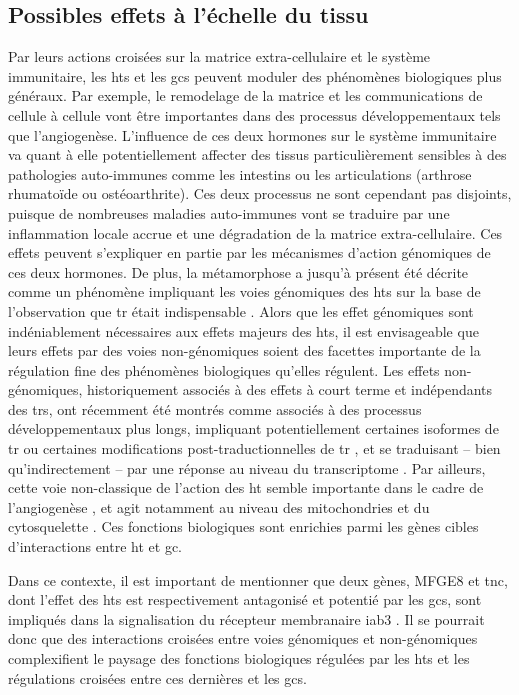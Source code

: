 \documentclass[../main.tex]{subfiles}
\begin{document}
	\subsection{Possibles effets à l’échelle du tissu}
		Par leurs actions croisées sur la matrice extra-cellulaire et le système immunitaire, les \glspl{ht} et les \glspl{gc} peuvent moduler des phénomènes biologiques plus généraux.
		Par exemple, le remodelage de la matrice et les communications de cellule à cellule vont être importantes dans des processus développementaux tels que l'angiogenèse.
		L'influence de ces deux hormones sur le système immunitaire va quant à elle potentiellement affecter des tissus particulièrement sensibles à des pathologies auto-immunes comme les intestins ou les articulations (arthrose rhumatoïde ou ostéoarthrite).
		Ces deux processus ne sont cependant pas disjoints, puisque de nombreuses maladies auto-immunes vont se traduire par une inflammation locale accrue et une dégradation de la matrice extra-cellulaire.
		Ces effets peuvent s'expliquer en partie par les mécanismes d'action génomiques de ces deux hormones.
		De plus, la métamorphose a jusqu'à présent été décrite comme un phénomène impliquant les voies génomiques des \glspl{ht} sur la base de l'observation que \gls{tr} était indispensable \citep{Das2010}.
		Alors que les effet génomiques sont indéniablement nécessaires aux effets majeurs des \glspl{ht}, il est envisageable que leurs effets par des voies non-génomiques soient des facettes importante de la régulation fine des phénomènes biologiques qu'elles régulent.
		Les effets non-génomiques, historiquement associés à des effets à court terme et indépendants des \glspl{tr}, ont récemment été montrés comme associés à des processus développementaux plus longs, impliquant potentiellement certaines isoformes de \gls{tr} ou certaines modifications post-traductionnelles de \gls{tr} \citep{Davis2005}, et se traduisant – bien qu'indirectement – par une réponse au niveau du transcriptome \citep{Davis2011}.
		Par ailleurs, cette voie non-classique de l'action des \gls{ht} semble importante dans le cadre de l'angiogenèse \citep{Bergh2005}, et agit notamment au niveau des mitochondries et du cytosquelette \citep{Leonard2006,Siegrist-Kaiser1990}.
		Ces fonctions biologiques sont enrichies parmi les gènes cibles d’interactions entre \gls{ht} et \gls{gc}.
		\par
		Dans ce contexte, il est important de mentionner que deux gènes, MFGE8 et \gls{tnc}, dont l'effet des \glspl{ht} est respectivement antagonisé et potentié par les \glspl{gc}, sont impliqués dans la signalisation du récepteur membranaire \gls{iab3} \citep{Sriramarao1993,Aziz2009}.
		Il se pourrait donc que des interactions croisées entre voies génomiques et non-génomiques complexifient le paysage des fonctions biologiques régulées par les \glspl{ht} et les régulations croisées entre ces dernières et les \glspl{gc}.
\end{document}
